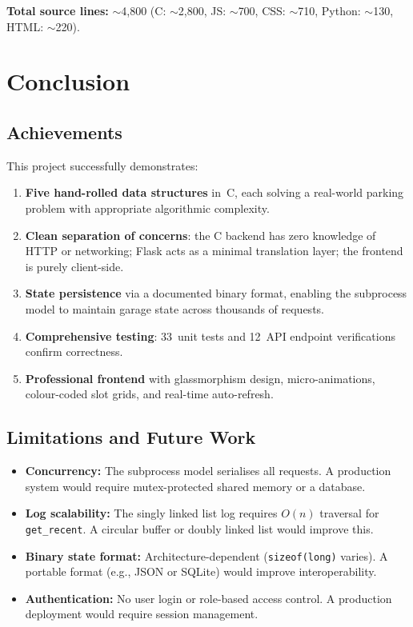 \documentclass[12pt, a4paper]{report}
\begin{document}
\textbf{Total source lines:} $\sim$4{,}800 (C: $\sim$2{,}800, JS:
$\sim$700, CSS: $\sim$710, Python: $\sim$130, HTML: $\sim$220).

\chapter{Conclusion}

\section{Achievements}

This project successfully demonstrates:

\begin{enumerate}[nosep]
  \item \textbf{Five hand-rolled data structures} in~C, each solving a
        real-world parking problem with appropriate algorithmic
        complexity.
  \item \textbf{Clean separation of concerns}: the C backend has zero
        knowledge of HTTP or networking; Flask acts as a minimal
        translation layer; the frontend is purely client-side.
  \item \textbf{State persistence} via a documented binary format,
        enabling the subprocess model to maintain garage state across
        thousands of requests.
  \item \textbf{Comprehensive testing}: 33~unit tests and 12~API
        endpoint verifications confirm correctness.
  \item \textbf{Professional frontend} with glassmorphism design, micro-animations,
        colour-coded slot grids, and real-time auto-refresh.
\end{enumerate}

\section{Limitations and Future Work}

\begin{itemize}[nosep]
  \item \textbf{Concurrency:} The subprocess model serialises all
        requests.  A production system would require mutex-protected
        shared memory or a database.
  \item \textbf{Log scalability:} The singly linked list log requires
        $O(n)$ traversal for \texttt{get\_recent}.  A circular buffer or
        doubly linked list would improve this.
  \item \textbf{Binary state format:} Architecture-dependent
        (\texttt{sizeof(long)} varies).  A portable format (e.g., JSON
        or SQLite) would improve interoperability.
  \item \textbf{Authentication:} No user login or role-based access
        control.  A production deployment would require session
        management.
\end{itemize}
\end{document}
